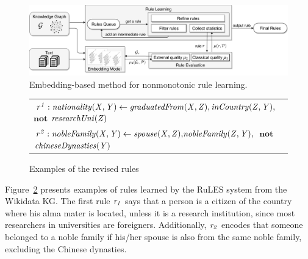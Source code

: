 


   \begin{figure}[t]
\centering
\includegraphics[width=1\textwidth]{figures/rules_overview_H.pdf}
\caption{Embedding-based method for nonmonotonic rule learning.}
\label{fig:system_RulES}
\end{figure}

\begin{figure}[t]
    \centering
   
    \vspace{-.2cm}
    \begin{tabular}{l}
 {\scriptsize
        $\mathit{r^1: nationality(X, Y)}  \leftarrow
        \mathit{graduatedFrom(X, Z)},\mathit{inCountry(Z,Y)},$ $ \textbf{not}$  $\mathit{researchUni(Z)} $}\\        
          {\scriptsize 
$\mathit{r^2:  nobleFamily(X, Y)}  \leftarrow
        \mathit{spouse(X, Z)}{,}\mathit{nobleFamily(Z, Y)}{,}$ $ \textbf{not}$  $\mathit{chineseDynasties(Y)} $} \\
 \end{tabular}     
  \vspace{-.2cm}
    \caption{Examples of the revised rules}
 \label{fig:examplerules}
 \vspace{-.6cm}
\end{figure}
 Figure~\ref{fig:examplerules} presents examples of rules learned by the RuLES system from the Wikidata KG. The first rule $\mathit{r_1}$ says that a person is a citizen of the country where his alma mater is located, unless it is a research institution, since most researchers in
universities are foreigners. Additionally,
$\mathit{r_2}$ encodes that someone belonged to a noble family if his/her spouse is also from the
same noble family, excluding the Chinese dynasties. 